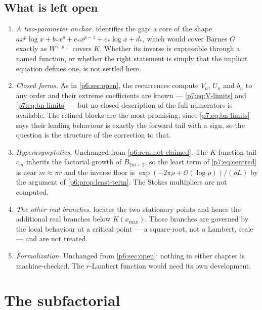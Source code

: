 \documentclass[11pt,a4paper,oneside]{book}
\theoremstyle{plain}
\theoremstyle{definition}
\theoremstyle{remark}
\newcommand{\bigO}{\mathcal{O}}
\newcommand{\Wlam}{W}
\begin{document}
\section{What is left open}
\label{p7:sec:open}

\begin{enumerate}
\item \emph{A two-parameter anchor.}   identifies the
gap: a core of the shape $ax^{p}\log x+b_{*}x^{p}+e_{*}x^{p-1}+c_{*}\log x
+d_{*}$, which would cover Barnes $G$ exactly as $\Wlam^{(\varrho)}$ covers
$K$.  Whether its inverse is expressible through a named function, or whether
the right statement is simply that the implicit equation defines one, is not
settled here.
\item \emph{Closed forms.}  As in \cref{p6:sec:open}, the recurrences compute
$V_n$, $U_n$ and $b_n$ to any order and their extreme coefficients are known
--- \eqref{p7:eq:V-limits} and \eqref{p7:eq:bn-limits} --- but no closed
description of the full numerators is available.  The refined blocks are the
most promising, since \eqref{p7:eq:bn-limits} says their leading behaviour is
exactly the forward tail with a sign, so the question is the structure of the
correction to that.
\item \emph{Hyperasymptotics.}  Unchanged from \cref{p6:rem:not-claimed}.  The
$K$-function tail $c_m$ inherits the factorial growth of $B_{2m+2}$, so the
least term of \eqref{p7:eq:centred} is near $m\approx\pi r$ and the inverse
floor is $\exp(-2\pi\rho+\bigO(\log\rho))/(\rho L)$ by the argument of
\cref{p6:prop:least-term}.  The Stokes multipliers are not computed.
\item \emph{The other real branches.}   locates the two
stationary points and hence the additional real branches below
$K(x_{\max})$.  Those branches are governed by the local behaviour at a
critical point --- a square-root, not a Lambert, scale --- and are not treated.
\item \emph{Formalization.}  Unchanged from \cref{p6:sec:open}: nothing in
either chapter is machine-checked.  The $r$-Lambert function would need its
own development.
\end{enumerate}

\chapter{The subfactorial}
\label{p8:sec:top}
\end{document}
